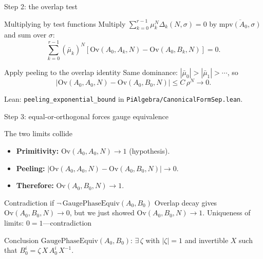 \documentclass[aspectratio=169,10pt]{beamer}
\newcommand{\Ov}{\mathrm{Ov}}
\begin{document}
\begin{frame}{Step 2: the overlap test}
    \vspace{-0.6em}

    \begin{block}{Multiplying by test functions}
        Multiply $\sum_{k=0}^{r-1} \mu_k^N \Delta_k(N,\sigma) = 0$
        by $\overline{\mathrm{mpv}(A_0,\sigma)}$ and sum over $\sigma$:
        \[
            \sum_{k=0}^{r-1} (\bar\mu_k)^N [\Ov(A_0,A_k,N) - \Ov(A_0,B_k,N)] = 0.
        \]
    \end{block}

    \begin{block}{Apply peeling to the overlap identity}
        Same dominance: $|\bar\mu_0|>|\bar\mu_1|>\cdots$, so
        \[
            \bigl|\Ov(A_0,A_0,N) - \Ov(A_0,B_0,N)\bigr| \le  C\,\rho^N \to  0.
        \]
    \end{block}

    \textcolor{dimwhite}{\footnotesize Lean: \texttt{peeling\_exponential\_bound} in \texttt{PiAlgebra/CanonicalFormSep.lean}.}
\end{frame}

\begin{frame}{Step 3: equal-or-orthogonal forces gauge equivalence}
    \vspace{-0.6em}

    \begin{block}{The two limits collide}
        \begin{itemize}\itemsep0.2em
            \item \textbf{Primitivity:}
                  $\Ov(A_0,A_0,N) \to 1$ \quad (hypothesis).
            \item \textbf{Peeling:}
                  $|\Ov(A_0,A_0,N) - \Ov(A_0,B_0,N)| \to 0$.
            \item \textbf{Therefore:} $\Ov(A_0,B_0,N) \to 1$.
        \end{itemize}
    \end{block}

    \begin{block}{Contradiction if $\lnot\,\mathrm{GaugePhaseEquiv}(A_0,B_0)$}
        Overlap decay gives $\Ov(A_0,B_0,N)\to 0$,
        but we just showed $\Ov(A_0,B_0,N)\to 1$.
        \alert{Uniqueness of limits}: $0 = 1$---contradiction
    \end{block}

    \begin{block}{Conclusion}
        $\mathrm{GaugePhaseEquiv}(A_0,B_0)$: $\exists\, \zeta$ with $|\zeta|=1$
        and invertible $X$ such that $B_0^i = \zeta\,X\,A_0^i\,X^{-1}$.
    \end{block}
\end{frame}
\end{document}
